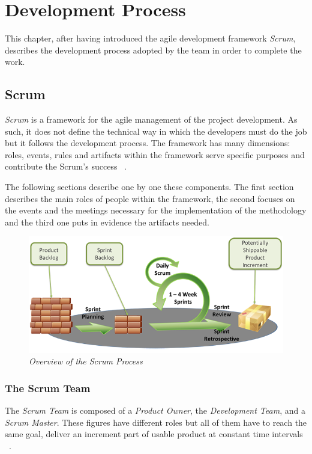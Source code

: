 \chapter{Development Process}
This chapter, after having introduced the agile development framework \emph{Scrum}, describes the development process adopted by the team in order to complete the work.

	\section{Scrum}\label{ref_scrum}
	\emph{Scrum} is a framework for the agile management of the project development. 
	As such, it does not define the technical way in which the developers must do the job but it follows the development process. 	
	The framework has many dimensions: roles, events, rules and artifacts within the framework serve specific purposes and contribute the Scrum's success ~\cite{scrumEnglishGuide}.  

	The following sections describe one by one these components. The first section describes the main roles of people within the framework, the second focuses on the events and the meetings necessary for the implementation of the methodology and the third one puts in evidence the artifacts needed.

	\begin{figure}[h]
	  \begin{center} 
	    \includegraphics[scale=0.45]{images/ch_04/scrum_overview.png}
	  \end{center} 
	  \caption{\textit{Overview of the Scrum Process}}  
	  \label{fig:ScrumOverview}
  	\end{figure}

\newpage

		\subsection{The Scrum Team}\label{ref_scrum_team}
		The \emph{Scrum Team} is composed of a \emph{Product Owner}, the \emph{Development Team}, and a \emph{Scrum Master}.
		These figures have different roles but all of them have to reach the same goal, deliver an increment part of usable product at constant time intervals ~\cite{scrumEnglishGuide}. %

